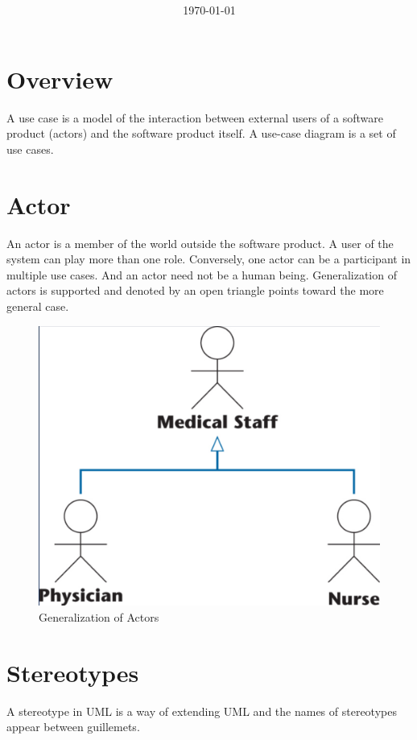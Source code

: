 \documentclass[11pt]{article}
\title{\textbf{\Topic}}
\author{\Name}
\date{\today}
\begin{document}
\maketitle
\noindent\makebox[\linewidth]{\rule[8pt]{5in}{0.5pt}}


\section*{Overview}
A use case is a model of the interaction between external users of a software product (actors) and the software product itself. A use-case diagram is a set of use cases.

\section*{Actor}

An actor is a member of the world outside the software product. A user of the system can play more than one role. Conversely, one actor can be a participant in multiple use cases. And an actor need not be a human being. Generalization of actors is supported and denoted by an open triangle points toward the more general case.

\begin{figure}[h]
	\centering
	\includegraphics[width=0.4\linewidth]{images/GeneralizationActor.png}
	\caption{Generalization of Actors}
	\label{fig:GeneralizationActor}
\end{figure}

\section*{Stereotypes}
 
A stereotype in UML is a way of extending UML and the names of stereotypes appear between guillemets.
\end{document}
